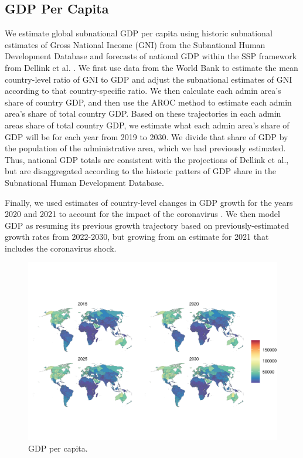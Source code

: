 \documentclass{article}
\begin{document}
\subsection{GDP Per Capita}
We estimate global subnational GDP per capita using historic subnational estimates of Gross National Income (GNI) from the Subnational Human Development Database \cite{Smits2019} and forecasts of national GDP within the SSP framework from Dellink et al. \cite{Dellink2017}.  We first use data from the World Bank to estimate the mean country-level ratio of GNI to GDP and adjust the subnational estimates of GNI according to that country-specific ratio.  We then calculate each admin area's share of country GDP, and then use the AROC method to estimate each admin area's share of total country GDP.  Based on these trajectories in each admin areas share of total country GDP, we estimate what each admin area's share of GDP will be for each year from 2019 to 2030.  We divide that share of GDP by the population of the administrative area, which we had previously estimated.  Thus, national GDP totals are consistent with the projections of Dellink et al., but are disaggregated according to the historic patters of GDP share in the Subnational Human Development Database.

Finally, we used estimates of country-level changes in GDP growth for the years 2020 and 2021 to account for the impact of the coronavirus \citep{prospects2020}.  We then model GDP as resuming its previous growth trajectory based on previously-estimated growth rates from 2022-2030, but growing from an estimate for 2021 that includes the coronavirus shock.

\begin{figure}[H]
  \centering
  \includegraphics[width=\linewidth]{img/covars/gdp_percap.png}
  \caption{GDP per capita.}
\end{figure}
\end{document}
